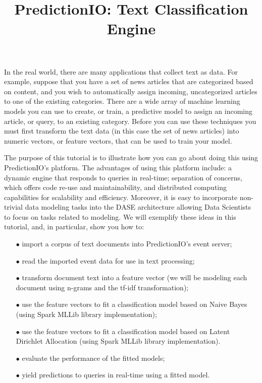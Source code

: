 \documentclass[a4paper,12pt]{article}
\renewcommand{\bf}[1]{\textbf{#1}}
\newcommand{\3}{\left}
\newcommand{\4}{\right}
\renewcommand{\-}[1]{{}^{-#1}}
\begin{document}
\title{\vspace{-1.5 cm}\bf{PredictionIO: Text Classification Engine}}
\author{\vspace{-2cm}}
\date{}
\maketitle


In the real world, there are many applications that collect text as data. For example, suppose that you have a set of news articles that are categorized based on content, and you wish to automatically assign incoming, uncategorized articles to one of the existing categories. There are a wide array of machine learning models you can use to create, or train, a predictive model to assign an incoming article, or query, to an existing category. Before you can use these techniques you must first transform the text data (in this case the set of news articles) into numeric vectors, or feature vectors, that can be used to train your model.

The purpose of this tutorial is to illustrate how you can go about doing this using PredictionIO's platform. The advantages of using this platform include: a dynamic engine that responds to queries in real-time; separation of concerns,
 which offers code re-use and maintainability, and distributed computing capabilities for scalability and efficiency. Moreover, it is easy to incorporate non-trivial data modeling tasks into the DASE architecture allowing Data Scientists to focus on tasks related to modeling. We will exemplify these ideas in this tutorial, and, in particular, show you how to:

\begin{itemize}
\item[$\bullet$]{import a corpus of text documents into PredictionIO's event server;}

\item[$\bullet$]{read the imported event data for use in text processing;}

\item[$\bullet$]{transform document text into a feature vector (we will be modeling each document using n-grams and the tf-idf transformation);}

\item[$\bullet$]{use the feature vectors to fit a classification model based on Naive Bayes (using Spark MLLib library implementation);}

\item[$\bullet$]{use the feature vectors to fit a classification model based on Latent Dirichlet Allocation (using Spark MLLib library implementation).}

\item[$\bullet$]{evaluate the performance of the fitted models;}

\item[$\bullet$]{yield predictions to queries in real-time using a fitted model.}
\end{itemize}
\end{document}
